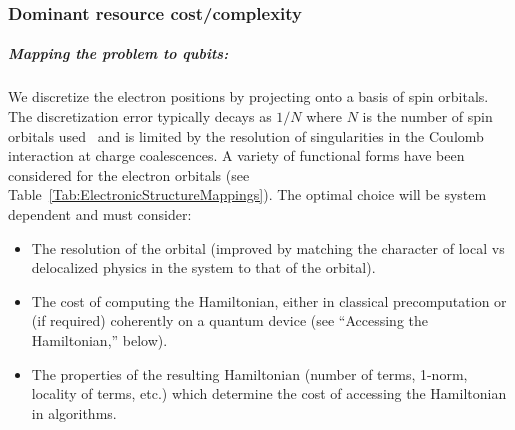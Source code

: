\begin{refsection}
\subsubsection*{Dominant resource cost/complexity}


\subparagraph{Mapping the problem to qubits:}
We discretize the electron positions by projecting onto a basis of spin orbitals. The discretization error typically decays as $1/N$ where $N$ is the number of spin orbitals used~\cite{halkier1998BasisSet,shepherd2012PlaneWaveConvergence} and is limited by the resolution of singularities in the Coulomb interaction at charge coalescences. A variety of functional forms have been considered for the electron orbitals (see Table~\ref{Tab:ElectronicStructureMappings}). The optimal choice will be system dependent and must consider:
\begin{itemize}
    \item The resolution of the orbital (improved by matching the character of local vs delocalized physics in the system to that of the orbital).
    \item The cost of computing the Hamiltonian, either in classical precomputation or (if required) coherently on a quantum device (see ``Accessing the Hamiltonian,'' below). 
    \item The properties of the resulting Hamiltonian (number of terms, 1-norm, locality of terms, etc.) which determine the cost of accessing the Hamiltonian in algorithms.
\end{itemize}



\end{refsection}
